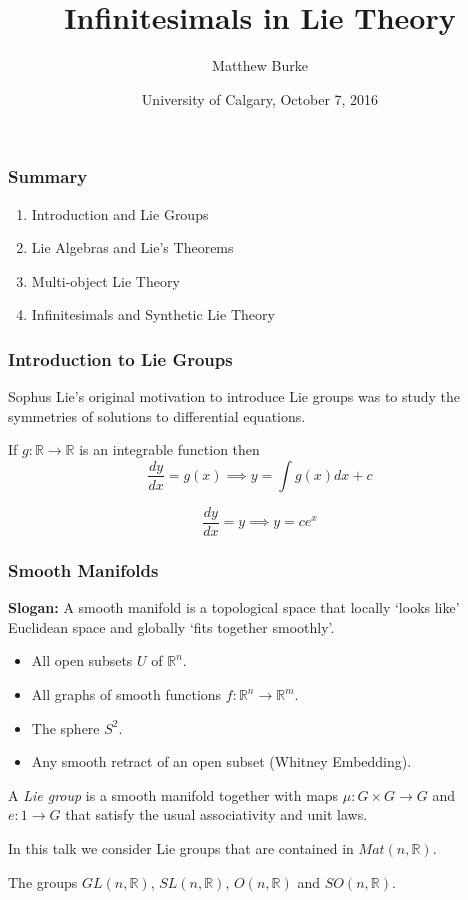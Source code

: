 \documentclass[]{beamer}
\title{Infinitesimals in Lie Theory}
\author{Matthew Burke}
\date{University of Calgary, October 7, 2016}
\begin{document}
\begin{frame}
\titlepage
\end{frame}

\begin{frame}[c]\frametitle{Summary}
  \begin{enumerate}
    \setlength{\itemsep}{25pt}
    \item Introduction and Lie Groups
    \item Lie Algebras and Lie's Theorems
    \item Multi-object Lie Theory
    \item Infinitesimals and Synthetic Lie Theory
  \end{enumerate}
\end{frame}

\begin{frame}[fragile]
\frametitle{Introduction to Lie Groups}
Sophus Lie's original motivation to introduce Lie groups was to study the symmetries of solutions to differential equations.
\begin{example}
    If $g:\mathbb{R}\rightarrow \mathbb{R}$ is an integrable function then
    \begin{equation*}
        \frac{dy}{dx}=g(x)\implies y = \int g(x)dx +c
    \end{equation*}
\end{example}
\begin{example}
    \begin{equation*}
        \frac{dy}{dx}=y\implies y=ce^x
    \end{equation*}
\end{example}
\end{frame}

\begin{frame}\frametitle{Smooth Manifolds}
        \textbf{Slogan:} A smooth manifold is a topological space that locally `looks like' Euclidean space and globally `fits together smoothly'.
    \begin{example}
        \begin{itemize}
            \item All open subsets $U$ of $\mathbb{R}^n$.
            \item All graphs of smooth functions $f:\mathbb{R}^n\rightarrow \mathbb{R}^m$.
            \item The sphere $S^2$.
            \item Any smooth retract of an open subset (Whitney Embedding).
        \end{itemize}
    \end{example}
\begin{definition}
    A \emph{Lie group} is a smooth manifold together with maps $\mu:G\times G\rightarrow G$ and $e:1\rightarrow G$ that satisfy the usual associativity and unit laws.
\end{definition}
    In this talk we consider Lie groups that are contained in $Mat(n,\mathbb{R})$.
    \begin{example}
        The groups $GL(n,\mathbb{R})$, $SL(n,\mathbb{R})$, $O(n,\mathbb{R})$ and $SO(n,\mathbb{R})$.
    \end{example}
\end{frame}
\end{document}

